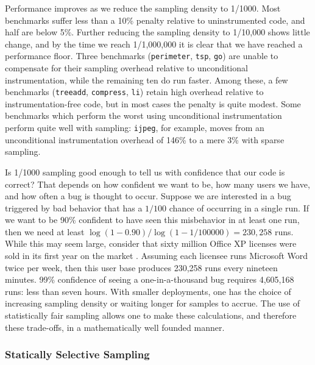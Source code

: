 Performance improves as we reduce the sampling density to 1/1000.
Most benchmarks suffer less than a 10\% penalty relative to
uninstrumented code, and half are below 5\%.  Further reducing the
sampling density to 1/10,000 shows little change, and by the time we
reach 1/1,000,000 it is clear that we have reached a performance
floor.  Three benchmarks (\texttt{perimeter}, \texttt{tsp},
\texttt{go}) are unable to compensate for their sampling overhead
relative to unconditional instrumentation, while the remaining ten do
run faster.  Among these, a few benchmarks (\texttt{treeadd},
\texttt{compress}, \texttt{li}) retain high overhead relative to
instrumentation-free code, but in most cases the penalty is quite
modest.  Some benchmarks which perform the worst using unconditional
instrumentation perform quite well with sampling: \texttt{ijpeg}, for
example, moves from an unconditional instrumentation overhead of 146\%
to a mere 3\% with sparse sampling.

Is 1/1000 sampling good enough to tell us with confidence that our
code is correct?  That depends on how confident we want to be, how
many users we have, and how often a bug is thought to occur.  Suppose
we are interested in a bug triggered by bad behavior that has a
$1/100$ chance of occurring in a single run.  If we want to be 90\%
confident to have seen this misbehavior in at least one run, then we
need at least $\log{(1-0.90)} / \log{( 1 - 1/100000)} = 230,258$ runs.
While this may seem large, consider that sixty million Office XP
licenses were sold in its first year on the market
\cite{Microsoft:2002:AR-F10K}.  Assuming each licensee runs Microsoft
Word twice per week, then this user base produces 230,258 runs every
nineteen minutes.  99\% confidence of seeing a one-in-a-thousand bug
requires 4,605,168 runs: less than seven hours.  With smaller
deployments, one has the choice of increasing sampling density or
waiting longer for samples to accrue.  The use of statistically fair
sampling allows one to make these calculations, and therefore these
trade-offs, in a mathematically well founded manner.

\subsubsection{Statically Selective Sampling}
\label{sec:ccured:single}

